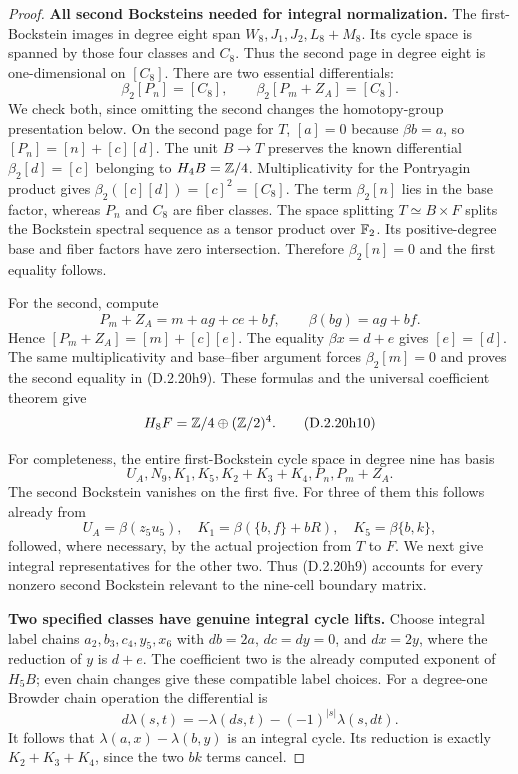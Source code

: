 \begin{proof}
\medskip\noindent
\textbf{All second Bocksteins needed for integral normalization.}
The first-Bockstein images in degree eight span
$W_8,J_1,J_2,L_8+M_8$. Its cycle space is spanned
by those four classes and $C_8$. Thus the second
page in degree eight is one-dimensional on $[C_8]$.
There are two essential differentials:
\[
 \beta_2[P_n]=[C_8],\qquad
 \beta_2[P_m+Z_A]=[C_8].
 \tag{D.2.20h9}
\]
We check both, since omitting the second changes the
homotopy-group presentation below.
On the second page for $T$, $[a]=0$ because
$\beta b=a$, so $[P_n]=[n]+[c][d]$.
The unit $B\to T$ preserves the known differential
$\beta_2[d]=[c]$ belonging to $H_4B=\mathbb Z/4$.
Multiplicativity for the Pontryagin product gives
$\beta_2([c][d])=[c]^2=[C_8]$.
The term $\beta_2[n]$ lies in the base factor,
whereas $P_n$ and $C_8$ are fiber classes.
The space splitting $T\simeq B\times F$ splits
the Bockstein spectral sequence as a tensor product
over $\mathbb F_2$. Its positive-degree base and fiber
factors have zero intersection. Therefore
$\beta_2[n]=0$ and the first equality follows.

For the second, compute
\[
 P_m+Z_A=m+ag+ce+bf,
 \qquad \beta(bg)=ag+bf.
\]
Hence $[P_m+Z_A]=[m]+[c][e]$.
The equality $\beta x=d+e$ gives $[e]=[d]$.
The same multiplicativity and base--fiber argument
forces $\beta_2[m]=0$ and proves the second equality
in \textup{(D.2.20h9)}.
These formulas and the universal coefficient theorem give
\[
 H_8F=\mathbb Z/4\oplus(\mathbb Z/2)^4.
 \tag{D.2.20h10}
\]

For completeness, the entire first-Bockstein cycle
space in degree nine has basis
\[
 U_A,N_9,K_1,K_5,K_2+K_3+K_4,P_n,P_m+Z_A.
 \tag{D.2.20h11}
\]
The second Bockstein vanishes on the first five.
For three of them this follows already from
\[
 U_A=\beta(z_5u_5),\quad
 K_1=\beta(\{b,f\}+bR),\quad
 K_5=\beta\{b,k\},
\]
followed, where necessary, by the actual projection
from $T$ to $F$. We next give integral representatives
for the other two. Thus \textup{(D.2.20h9)} accounts
for every nonzero second Bockstein relevant to the
nine-cell boundary matrix.

\medskip\noindent
\textbf{Two specified classes have genuine integral cycle lifts.}
Choose integral label chains $a_2,b_3,c_4,y_5,x_6$
with $db=2a$, $dc=dy=0$, and $dx=2y$, where the
reduction of $y$ is $d+e$. The coefficient two is
the already computed exponent of $H_5B$; even
chain changes give these compatible label choices.
For a degree-one Browder chain operation the differential is
\[
 d\lambda(s,t)=-\lambda(ds,t)-(-1)^{|s|}\lambda(s,dt).
\]
It follows that $\lambda(a,x)-\lambda(b,y)$ is an
integral cycle. Its reduction is exactly
$K_2+K_3+K_4$, since the two $bk$ terms cancel.


\end{proof}
